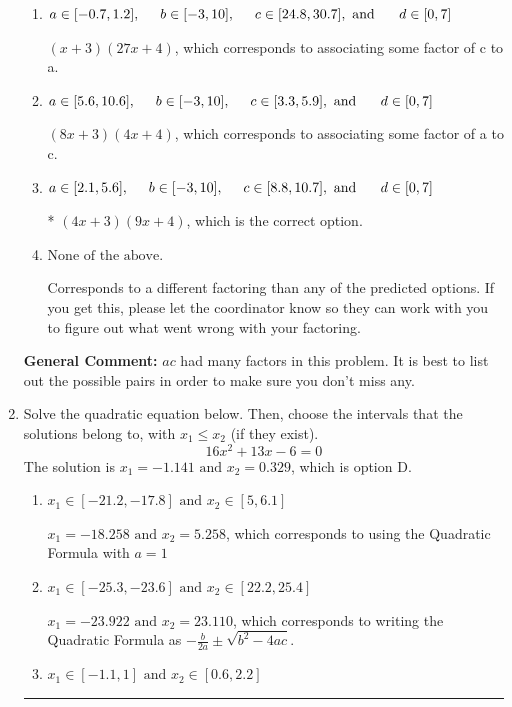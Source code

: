 \documentclass{extbook}[14pt]
\newcommand{\litem}[1]{\item #1

\rule{\textwidth}{0.4pt}}
\begin{document}
\begin{enumerate}
{\begin{enumerate}[label=\Alph*.]
 $(x + 16)(x + 27)$, which corresponds to factoring $x^{2} +43 x + 432$.
\item \( a \in [-0.7, 1.2], \hspace*{5mm} b \in [-3, 10], \hspace*{5mm} c \in [24.8, 30.7], \text{ and } \hspace*{5mm} d \in [0, 7] \)

 $(x + 3)(27x + 4)$, which corresponds to associating some factor of c to a.
\item \( a \in [5.6, 10.6], \hspace*{5mm} b \in [-3, 10], \hspace*{5mm} c \in [3.3, 5.9], \text{ and } \hspace*{5mm} d \in [0, 7] \)

 $(8x + 3)(4x + 4)$, which corresponds to associating some factor of a to c.
\item \( a \in [2.1, 5.6], \hspace*{5mm} b \in [-3, 10], \hspace*{5mm} c \in [8.8, 10.7], \text{ and } \hspace*{5mm} d \in [0, 7] \)

* $(4x + 3)(9x + 4)$, which is the correct option.
\item \( \text{None of the above.} \)

 Corresponds to a different factoring than any of the predicted options. If you get this, please let the coordinator know so they can work with you to figure out what went wrong with your factoring.
\end{enumerate}

\textbf{General Comment:} $ac$ had many factors in this problem. It is best to list out the possible pairs in order to make sure you don't miss any.
}
\litem{
Solve the quadratic equation below. Then, choose the intervals that the solutions belong to, with $x_1 \leq x_2$ (if they exist).
\[ 16x^{2} +13 x -6 = 0 \]The solution is \( x_1 = -1.141 \text{ and } x_2 = 0.329 \), which is option D.\begin{enumerate}[label=\Alph*.]
\item \( x_1 \in [-21.2, -17.8] \text{ and } x_2 \in [5, 6.1] \)

 $x_1 = -18.258 \text{ and } x_2 = 5.258$, which corresponds to using the Quadratic Formula with $a=1$
\item \( x_1 \in [-25.3, -23.6] \text{ and } x_2 \in [22.2, 25.4] \)

 $x_1 = -23.922 \text{ and } x_2 = 23.110$, which corresponds to writing the Quadratic Formula as $-\frac{b}{2a} \pm \sqrt{b^2 - 4ac}$.
\item \( x_1 \in [-1.1, 1] \text{ and } x_2 \in [0.6, 2.2] \)


\end{enumerate}}
\end{enumerate}
\end{document}
